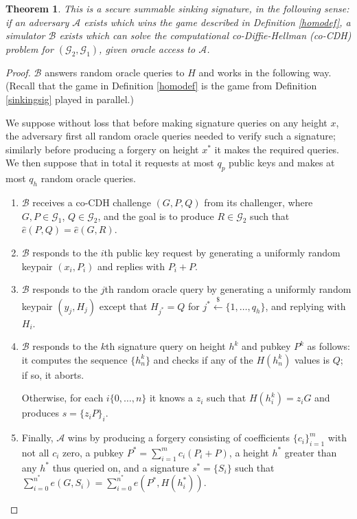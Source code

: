 \documentclass[letterpaper]{article}
\newtheorem{thrm}{Theorem}
\newcommand{\e}{\hat{e}}
\newcommand{\randgets}{\xleftarrow{\$}}
\begin{document}
\begin{thrm} This is a secure summable sinking signature, in the following
sense: if an adversary $\mathcal{A}$ exists which wins the game described
in Definition \ref{homodef}, a simulator $\mathcal{B}$ exists which can solve
the computational co-Diffie-Hellman (co-CDH) problem for $(\mathcal{G}_2,
\mathcal{G}_1)$, given oracle access to $\mathcal{A}$.\end{thrm}
\begin{proof} $\mathcal{B}$ answers random oracle queries to $H$ and
works in the following way. (Recall that the game in Definition
\ref{homodef} is the game from Definition \ref{sinkingsig} played
in parallel.)

We suppose without loss that before making signature queries on any height $x$,
the adversary first all random oracle queries needed to verify such a signature;
similarly before producing a forgery on height $x^*$ it makes the required queries.
We then suppose that in total it requests at most $q_p$ public keys and makes
at most $q_h$ random oracle queries.

\begin{enumerate}
\item $\mathcal{B}$ receives a co-CDH challenge $(G, P, Q)$ from its challenger,
where $G, P\in\mathcal{G}_1$, $Q\in\mathcal{G}_2$, and the goal is to produce
$R\in\mathcal{G}_2$ such that $\e(P, Q) = \e(G, R)$.

\item $\mathcal{B}$ responds to the $i$th public key request by generating
a uniformly random keypair $(x_i, P_i)$ and replies with $P_i + P$.

\item $\mathcal{B}$ responds to the $j$th random oracle query by generating
a uniformly random keypair $(y_j, H_j)$ except that $H_{j^*} = Q$ for
$j^*\randgets\{1,\ldots,q_h\}$, and replying with $H_i$.

\item $\mathcal{B}$ responds to the $k$th signature query on height $h^k$
and pubkey $P^k$ as follows: it computes the sequence $\{h^k_n\}$ and checks
if any of the $H(h^k_n)$ values is $Q$; if so, it aborts.

Otherwise, for each $i\{0,\ldots,n\}$ it knows a $z_i$ such that $H(h^k_i) = z_iG$
and produces $s = \{ z_iP \}_i$.

\item Finally, $\mathcal{A}$ wins by producing a forgery consisting of coefficients
$\{ c_i\}_{i=1}^m$ with not all $c_i$ zero, a pubkey $P^* = \sum_{i=1}^m c_i(P_i + P)$,
a height $h^*$ greater than any $h^*$ thus queried on, and a signature $s^* = \{S_i\}$
such that $\sum_{i=0}^{n^*}e(G, S_i) = \sum_{i=0}^{n^*} e(P^*, H(h^*_i))$.


\end{enumerate}
\end{proof}
\end{document}
